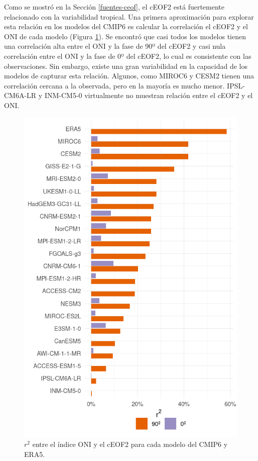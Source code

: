 \documentclass[12pt,oneside,a4paper]{reedthesis}
\begin{document}
Como se mostró en la Sección \ref{fuentes-ceof}, el cEOF2 está fuertemente relacionado con la variabilidad tropical.
Una primera aproximación para explorar esta relación en los modelos del CMIP6 es calcular la correlación el cEOF2 y el ONI de cada modelo (Figura \ref{fig:cor-enso-plot}).
Se encontró que casi todos los modelos tienen una correlación alta entre el ONI y la fase de 90º del cEOF2 y casi nula correlación entre el ONI y la fase de 0º del cEOF2, lo cual es consistente con las observaciones.
Sin embargo, existe una gran variabilidad en la capacidad de los modelos de capturar esta relación.
Algunos, como MIROC6 y CESM2 tienen una correlación cercana a la observada, pero en la mayoría es mucho menor.
IPSL-CM6A-LR y INM-CM5-0 virtualmente no muestran relación entre el cEOF2 y el ONI.



\begin{figure}

{\centering \includegraphics{figures/50-cmip6/cor-enso-plot-1} 

}

\caption{\(r^2\) entre el índice ONI y el cEOF2 para cada modelo del CMIP6 y ERA5.}\label{fig:cor-enso-plot}
\end{figure}
\end{document}
